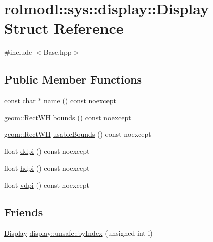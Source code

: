 \hypertarget{structrolmodl_1_1sys_1_1display_1_1_display}{}\section{rolmodl\+::sys\+::display\+::Display Struct Reference}
\label{structrolmodl_1_1sys_1_1display_1_1_display}


{\ttfamily \#include $<$Base.\+hpp$>$}

\subsection*{Public Member Functions}
\begin{DoxyCompactItemize}
\item 
const char $\ast$ \mbox{\hyperlink{structrolmodl_1_1sys_1_1display_1_1_display_a085fbf7ece5257a25e1446e1b352bae9}{name}} () const noexcept
\item 
\mbox{\hyperlink{structrolmodl_1_1geom_1_1_rect_w_h}{geom\+::\+Rect\+WH}} \mbox{\hyperlink{structrolmodl_1_1sys_1_1display_1_1_display_a51baa2e22efec2aff450a1062b1dbba6}{bounds}} () const noexcept
\item 
\mbox{\hyperlink{structrolmodl_1_1geom_1_1_rect_w_h}{geom\+::\+Rect\+WH}} \mbox{\hyperlink{structrolmodl_1_1sys_1_1display_1_1_display_a7f10fa135b1550c6d2c2c29a017a1b62}{usable\+Bounds}} () const noexcept
\item 
float \mbox{\hyperlink{structrolmodl_1_1sys_1_1display_1_1_display_a1c059d3652f60e71fdf9dc96324a72cf}{ddpi}} () const noexcept
\item 
float \mbox{\hyperlink{structrolmodl_1_1sys_1_1display_1_1_display_af1a4c7b5dbffe44b6d2c00af2146247f}{hdpi}} () const noexcept
\item 
float \mbox{\hyperlink{structrolmodl_1_1sys_1_1display_1_1_display_a91fdfe8231caad1801caf59b0d15594a}{vdpi}} () const noexcept
\end{DoxyCompactItemize}
\subsection*{Friends}
\begin{DoxyCompactItemize}
\item 
\mbox{\hyperlink{structrolmodl_1_1sys_1_1display_1_1_display}{Display}} \mbox{\hyperlink{structrolmodl_1_1sys_1_1display_1_1_display_aa210082510dd7ae5227ff2cf1b0fcd77}{display\+::unsafe\+::by\+Index}} (unsigned int i)
\end{DoxyCompactItemize}


